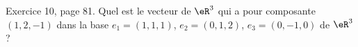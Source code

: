 \begin{exercice}\label{exoLineraire0021}

	Exercice 10, page 81. Quel est le vecteur de $\eR^3$ qui a pour composante $(1,2,-1)$ dans la base $e_1=(1,1,1)$, $e_2=(0,1,2)$, $e_3=(0,-1,0)$ de $\eR^3$ ?

\end{exercice}
